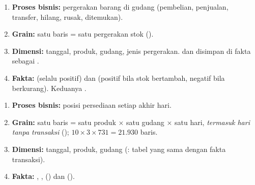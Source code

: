 \begin{enumerate}[nosep]
    \item \textbf{Proses bisnis:} pergerakan barang di gudang (pembelian, penjualan, transfer, hilang, rusak, ditemukan).
    \item \textbf{Grain:} satu baris = satu pergerakan stok ().
    \item \textbf{Dimensi:} tanggal, produk, gudang, jenis pergerakan.  dan  disimpan di fakta sebagai .
    \item \textbf{Fakta:}  (selalu positif) dan  (positif bila stok bertambah, negatif bila berkurang). Keduanya .
\end{enumerate}

\begin{enumerate}[nosep]
    \item \textbf{Proses bisnis:} posisi persediaan setiap akhir hari.
    \item \textbf{Grain:} satu baris = satu produk $\times$ satu gudang $\times$ satu hari, \emph{termasuk hari tanpa transaksi} (); $10 \times 3 \times 731 = 21.930$ baris.
    \item \textbf{Dimensi:} tanggal, produk, gudang (: tabel yang sama dengan fakta transaksi).
    \item \textbf{Fakta:} , ,  () dan  ().
\end{enumerate}

